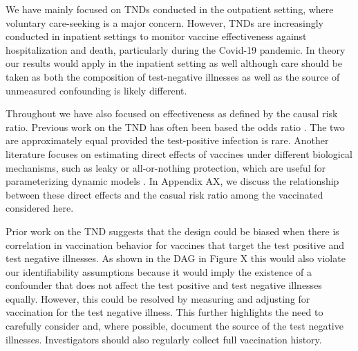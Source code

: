 \documentclass[11pt]{article}
\begin{document}
We have mainly focused on TNDs conducted in the outpatient setting, where voluntary care-seeking is a major concern. However, TNDs are increasingly conducted in inpatient settings to monitor vaccine effectiveness against hospitalization and death, particularly during the Covid-19 pandemic. In theory our results would apply in the inpatient setting as well although care should be taken as both the composition of test-negative illnesses as well as the source of unmeasured confounding is likely different. %

Throughout we have also focused on effectiveness as defined by the causal risk ratio. Previous work on the TND has often been based the odds ratio \cite{sullivan_theoretical_2016}. The two are approximately equal provided the test-positive infection is rare. Another literature focuses on estimating direct effects of vaccines under different biological mechanisms, such as leaky or all-or-nothing protection, which are useful for parameterizing dynamic models \cite{lewnard_measurement_2018,lewnard_theoretical_2021}. In Appendix AX, we discuss the relationship between these direct effects and the casual risk ratio among the vaccinated considered here.

Prior work on the TND suggests that the design could be biased when there is correlation in vaccination behavior for vaccines that target the test positive and test negative illnesses. As shown in the DAG in Figure X this would also violate our identifiability assumptions because it would imply the existence of a confounder that does not affect the test positive and test negative illnesses equally. However, this could be resolved by measuring and adjusting for vaccination for the test negative illness. This further highlights the need to carefully consider and, where possible, document the source of the test negative illnesses. Investigators should also regularly collect full vaccination history.

\newpage

\printbibliography
\end{document}
